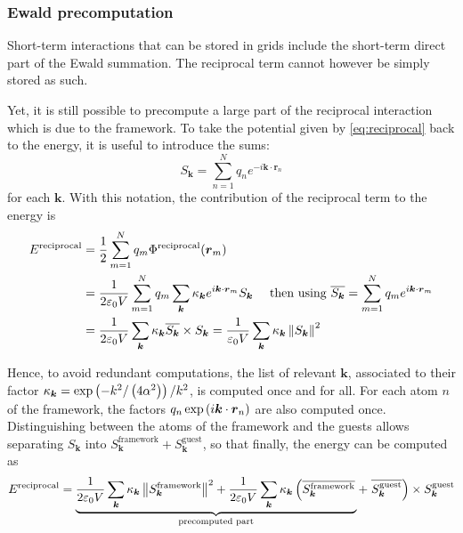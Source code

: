 \documentclass[main.tex]{subfiles}
\begin{document}
\subsubsection{Ewald precomputation}

Short-term interactions that can be stored in grids include the short-term direct part of the Ewald summation. The reciprocal term cannot however be simply stored as such.

Yet, it is still possible to precompute a large part of the reciprocal interaction which is due to the framework. To take the potential given by \cref{eq:reciprocal} back to the energy, it is useful to introduce the sums:
\[S_{\boldsymbol k} = \sum_{n=1}^N q_n e^{-i\boldsymbol k\cdot \boldsymbol r_n}\label{eq:Sk}\]
for each $\boldsymbol k$. With this notation, the contribution of the reciprocal term to the energy is
\[\begin{split}
E^\text{reciprocal} &= \frac12\sum_{m=1}^N q_m \Phi^\text{reciprocal}(\boldsymbol{r}_m)
\\&= \frac1{2\varepsilon_0V} \sum_{m=1}^N q_m \sum_{\boldsymbol{k}} \kappa_{\boldsymbol k} e^{i\boldsymbol k\cdot\boldsymbol r_m}S_{\boldsymbol{k}} \quad\text{ then using }\overline{S_{\boldsymbol{k}}} = \sum_{m=1}^N q_me^{i\boldsymbol k\cdot\boldsymbol r_m}
\\&= \frac1{2\varepsilon_0V} \sum_{\boldsymbol{k}} \kappa_{\boldsymbol k} \overline{S_{\boldsymbol{k}}} \times S_{\boldsymbol{k}}
= \frac1{\varepsilon_0V} \sum_{\boldsymbol{k}} \kappa_{\boldsymbol k} \left\|S_{\boldsymbol{k}}\right\|^2
\end{split}\]

Hence, to avoid redundant computations, the list of relevant $\boldsymbol{k}$, associated to their factor $\kappa_{\boldsymbol k} = \exp\left(-k^2/\left(4\alpha^2\right)\right)/k^2$, is computed once and for all. For each atom $n$ of the framework, the factors $q_n\exp\left(i\boldsymbol{k}\cdot\boldsymbol{r}_n\right)$ are also computed once.
Distinguishing between the atoms of the framework and the guests allows separating $S_{\boldsymbol k}$ into $S_{\boldsymbol k}^\text{framework} + S_{\boldsymbol k}^\text{guest}$, so that finally, the energy can be computed as
\[E^\text{reciprocal} = \underbrace{
	\frac1{2\varepsilon_0V} \sum_{\boldsymbol k} \kappa_{\boldsymbol k}\left\|S_{\boldsymbol k}^\text{framework}\right\|^2 + \frac1{2\varepsilon_0V} \sum_{\boldsymbol k}\kappa_{\boldsymbol k} \left(\overline{S_{\boldsymbol k}^\text{framework}}\right.
}_\text{precomputed part}
+ \left.\overline{S_{\boldsymbol k}^\text{guest}}\right) \times S_{\boldsymbol k}^\text{guest}\label{eq:reciprocal_decomposed}\]
\end{document}
